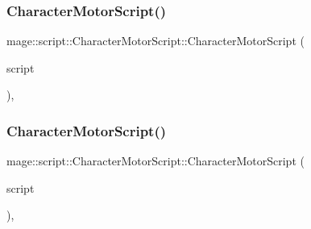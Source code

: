 \subsubsection{\texorpdfstring{Character\+Motor\+Script()}{CharacterMotorScript()}\hspace{0.1cm}{\footnotesize\ttfamily [2/3]}}
{\footnotesize\ttfamily mage\+::script\+::\+Character\+Motor\+Script\+::\+Character\+Motor\+Script (\begin{DoxyParamCaption}\item[{const \hyperlink{classmage_1_1script_1_1_character_motor_script}{Character\+Motor\+Script} \&}]{script }\end{DoxyParamCaption})\hspace{0.3cm}{\ttfamily [default]}, {\ttfamily [noexcept]}}

\hypertarget{classmage_1_1script_1_1_character_motor_script_ad822459ba8d2bbd5a30d598c41c5a281}{}\label{classmage_1_1script_1_1_character_motor_script_ad822459ba8d2bbd5a30d598c41c5a281} 
\subsubsection{\texorpdfstring{Character\+Motor\+Script()}{CharacterMotorScript()}\hspace{0.1cm}{\footnotesize\ttfamily [3/3]}}
{\footnotesize\ttfamily mage\+::script\+::\+Character\+Motor\+Script\+::\+Character\+Motor\+Script (\begin{DoxyParamCaption}\item[{\hyperlink{classmage_1_1script_1_1_character_motor_script}{Character\+Motor\+Script} \&\&}]{script }\end{DoxyParamCaption})\hspace{0.3cm}{\ttfamily [default]}, {\ttfamily [noexcept]}}

\hypertarget{classmage_1_1script_1_1_character_motor_script_a83ed3c2fcb60cef046499fd9c44f86ee}{}\label{classmage_1_1script_1_1_character_motor_script_a83ed3c2fcb60cef046499fd9c44f86ee} 
